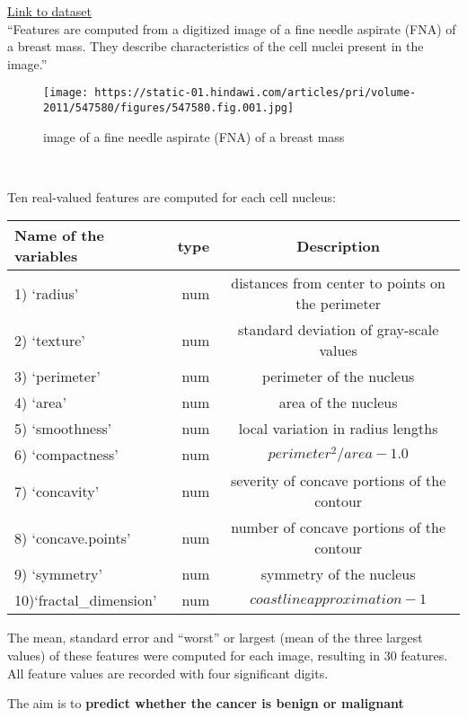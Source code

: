 \documentclass[
  11pt,
]{article}
\begin{document}
\href{https://archive.ics.uci.edu/ml/datasets/Breast+Cancer+Wisconsin+\%28Diagnostic\%29}{Link
to dataset}\\

``Features are computed from a digitized image of a fine needle aspirate
(FNA) of a breast mass. They describe characteristics of the cell nuclei
present in the image.''\\

\begin{figure}
\centering
\texttt{[image: https://static-01.hindawi.com/articles/pri/volume-2011/547580/figures/547580.fig.001.jpg]}
\caption{image of a fine needle aspirate (FNA) of a breast mass}
\end{figure}

\(~\) \(~\)

Ten real-valued features are computed for each cell nucleus:

\begin{longtable}[]{@{}lrc@{}}
\toprule
Name of the variables & type & Description \\
\midrule
\endhead
1) `radius' & num & distances from center to points on the perimeter \\
2) `texture' & num & standard deviation of gray-scale values \\
3) `perimeter' & num & perimeter of the nucleus \\
4) `area' & num & area of the nucleus \\
5) `smoothness' & num & local variation in radius lengths \\
6) `compactness' & num & \(perimeter^2 / area - 1.0\) \\
7) `concavity' & num & severity of concave portions of the contour \\
8) `concave.points' & num & number of concave portions of the contour \\
9) `symmetry' & num & symmetry of the nucleus \\
10)`fractal\_dimension' & num & \(coastline approximation - 1\) \\
\bottomrule
\end{longtable}

The mean, standard error and ``worst'' or largest (mean of the three
largest values) of these features were computed for each image,
resulting in 30 features. All feature values are recorded with four
significant digits.

The aim is to \textbf{predict whether the cancer is benign or malignant}
\end{document}
